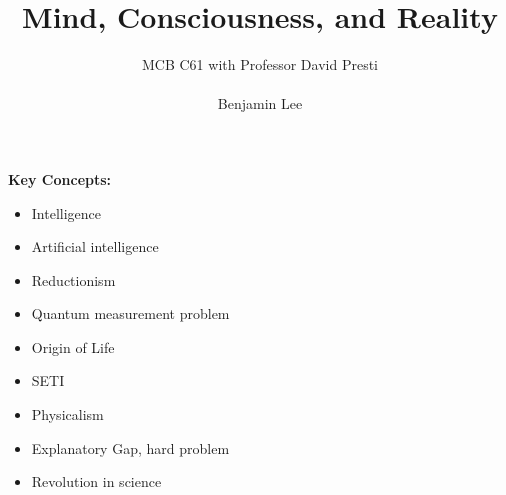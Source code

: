 \documentclass{article}
\title{Mind, Consciousness, and Reality}
\author{MCB C61 with Professor David Presti \\ \\ Benjamin Lee}
\begin{document}
\maketitle

\textbf{Key Concepts:}
\begin{itemize}
    \item Intelligence
    \item Artificial intelligence
    \item Reductionism
    \item Quantum measurement problem
    \item Origin of Life
    \item SETI
    \item Physicalism
    \item Explanatory Gap, hard problem
    \item Revolution in science
\end{itemize}

\newpage
\end{document}

